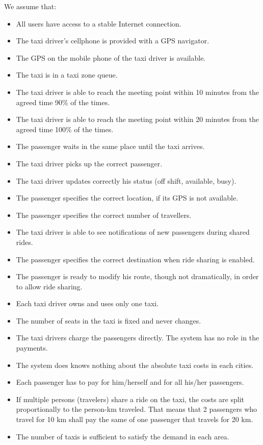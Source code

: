 We assume that:
\begin{itemize}
    \item All users have access to a stable Internet connection.
    \item The taxi driver's cellphone is provided with a GPS navigator.
    \item The GPS on the mobile phone of the taxi driver is available.
    \item The taxi is in a taxi zone queue.
    \item The taxi driver is able to reach the meeting point within 10 minutes from the agreed time 90\% of the times.
    \item The taxi driver is able to reach the meeting point within 20 minutes from the agreed time 100\% of the times.
    \item The passenger waits in the same place until the taxi arrives.
    \item The taxi driver picks up the correct passenger.
    \item The taxi driver updates correctly his status (off shift, available, busy).
    \item The passenger specifies the correct location, if its GPS is not available.
    \item The passenger specifies the correct number of travellers.
    \item The taxi driver is able to see notifications of new passengers during shared rides.
    \item The passenger specifies the correct destination when ride sharing is enabled.
    \item The passenger is ready to modify his route, though not dramatically, in order to allow ride sharing.
    \item Each taxi driver owns and uses only one taxi.
    \item The number of seats in the taxi is fixed and never changes.
    \item The taxi drivers charge the passengers directly. The system has no role in the payments.
    \item The system does knows nothing about the absolute taxi costs in each cities.
    \item Each passenger has to pay for him/herself and for all his/her passengers.
    \item If multiple persons (travelers) share a ride on the taxi, the costs are split proportionally to the person-km traveled. That means that 2 passengers who travel for 10 km shall pay the same of one passenger that travels for 20 km.
    \item The number of taxis is sufficient to satisfy the demand in each area.
\end{itemize}
